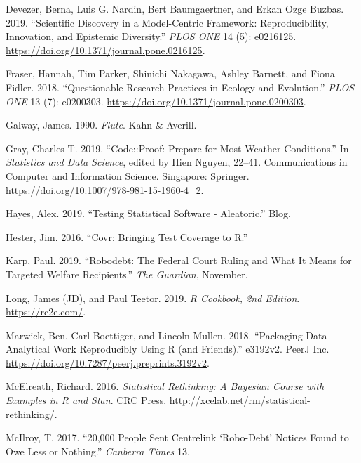 \documentclass[
]{article}
\newlength{\cslhangindent}
\newenvironment{cslreferences}%
  {\setlength{\parindent}{0pt}%
  \everypar{\setlength{\hangindent}{\cslhangindent}}\ignorespaces}%
  {\par}
\begin{document}
\begin{cslreferences}
\leavevmode\hypertarget{ref-devezerScientificDiscoveryModelcentric2019}{}%
Devezer, Berna, Luis G. Nardin, Bert Baumgaertner, and Erkan Ozge Buzbas. 2019. ``Scientific Discovery in a Model-Centric Framework: Reproducibility, Innovation, and Epistemic Diversity.'' \emph{PLOS ONE} 14 (5): e0216125. \url{https://doi.org/10.1371/journal.pone.0216125}.

\leavevmode\hypertarget{ref-fraser_questionable_2018}{}%
Fraser, Hannah, Tim Parker, Shinichi Nakagawa, Ashley Barnett, and Fiona Fidler. 2018. ``Questionable Research Practices in Ecology and Evolution.'' \emph{PLOS ONE} 13 (7): e0200303. \url{https://doi.org/10.1371/journal.pone.0200303}.

\leavevmode\hypertarget{ref-galway_flute_1990}{}%
Galway, James. 1990. \emph{Flute}. Kahn \& Averill.

\leavevmode\hypertarget{ref-grayCodeProofPrepare2019}{}%
Gray, Charles T. 2019. ``Code::Proof: Prepare for Most Weather Conditions.'' In \emph{Statistics and Data Science}, edited by Hien Nguyen, 22--41. Communications in Computer and Information Science. Singapore: Springer. \url{https://doi.org/10.1007/978-981-15-1960-4_2}.

\leavevmode\hypertarget{ref-hayes_testing_2019}{}%
Hayes, Alex. 2019. ``Testing Statistical Software - Aleatoric.'' Blog.

\leavevmode\hypertarget{ref-hester_covr_2016}{}%
Hester, Jim. 2016. ``Covr: Bringing Test Coverage to R.''

\leavevmode\hypertarget{ref-karp_robodebtfederalcourt_2019}{}%
Karp, Paul. 2019. ``Robodebt: The Federal Court Ruling and What It Means for Targeted Welfare Recipients.'' \emph{The Guardian}, November.

\leavevmode\hypertarget{ref-longCookbook2ndEdition2019}{}%
Long, James (JD), and Paul Teetor. 2019. \emph{R Cookbook, 2nd Edition}. \url{https://rc2e.com/}.

\leavevmode\hypertarget{ref-marwick_packaging_2018}{}%
Marwick, Ben, Carl Boettiger, and Lincoln Mullen. 2018. ``Packaging Data Analytical Work Reproducibly Using R (and Friends).'' e3192v2. PeerJ Inc. \url{https://doi.org/10.7287/peerj.preprints.3192v2}.

\leavevmode\hypertarget{ref-statrethinkingbook}{}%
McElreath, Richard. 2016. \emph{Statistical Rethinking: A Bayesian Course with Examples in R and Stan}. CRC Press. \url{http://xcelab.net/rm/statistical-rethinking/}.

\leavevmode\hypertarget{ref-mcilroy201720}{}%
McIlroy, T. 2017. ``20,000 People Sent Centrelink `Robo-Debt' Notices Found to Owe Less or Nothing.'' \emph{Canberra Times} 13.


\end{cslreferences}
\end{document}
